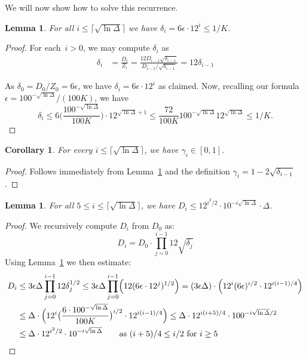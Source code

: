 \documentclass[11pt]{amsart}
\newtheorem{lemma}[theorem]{Lemma}
\newtheorem{corollary}[theorem]{Corollary}
\begin{document}
We will now show how to solve this recurrence.
\begin{lemma}
\label{r-prop3}
For all $i \leq \lceil \sqrt{\ln \Delta} \rceil$ we have $\delta_i = 6 \epsilon \cdot 12^i \leq 1/K$.
\end{lemma}
\begin{proof}
For each~$i > 0$, we may compute $\delta_i$ as
\begin{align*}
\delta_i &= \frac{D_i}{Z_i} = \frac{12 D_{i-1} \sqrt{\delta_{i-1}}}{D_{i-1}/\sqrt{\delta_{i-1}}} = 12 \delta_{i-1}
\end{align*}

As  $\delta_0 = D_0/Z_0 = 6 \epsilon$, we have $\delta_i = 6 \epsilon \cdot 12^i$ as claimed. Now, recalling our formula $\epsilon = 100^{-\sqrt{\ln \Delta}} / (100 K)$, we have 
$$
\delta_i \leq 6 \bigl( \frac{ 100^{-\sqrt{\ln \Delta}}}{100 K}  \bigr) \cdot  12^{\sqrt{\ln \Delta}+1} \leq \frac{ 72 }{100 K} 100^{-\sqrt{\ln \Delta}} 12^{\sqrt{\ln \Delta}} \leq 1/K.
$$
\end{proof}

\begin{corollary}
\label{gamma-cor}
For every $i \leq \lceil \sqrt{\ln \Delta} \rceil$, we have $\gamma_i \in [0,1]$.
\end{corollary}
\begin{proof}
Follows immediately from Lemma~\ref{r-prop3} and the definition $\gamma_i = 1 - 2 \sqrt{\delta_{i-1}}$.
\end{proof}

\begin{lemma}
\label{r-prop2}
For all $5 \leq i \leq \lceil \sqrt{\ln \Delta} \rceil$, we have $D_i \leq 12^{i^2/2} \cdot 10^{-i \sqrt{\ln \Delta}} \cdot \Delta$.
\end{lemma}
\begin{proof}
We recursively compute $D_i$ from $D_0$ as:
\begin{equation}
\label{d-rec-eqn}
D_i = D_0 \cdot \prod_{j=0}^{i-1} 12 \sqrt{\delta_j}
\end{equation}
Using Lemma~\ref{r-prop3} we then estimate:
\begin{align*}
D_i &\leq 3 \epsilon \Delta \prod_{j=0}^{i-1}  12 \delta_j^{1/2} \leq 3 \epsilon \Delta \prod_{j=0}^{i-1} \Bigl( 12 (6 \epsilon \cdot 12^j)^{1/2} \Bigr) = (3\epsilon\Delta)\cdot \Bigl( 12^{i} (6\epsilon)^{i/2} \cdot 12^{i(i-1)/4} \Bigr) \\
&\leq \Delta \cdot \Bigl (12^{i} \bigl( \frac{6 \cdot 100^{- \sqrt{\ln \Delta}}}{100 K} \bigr)^{i/2} \cdot 12^{i(i-1)/4} \Bigr) \leq \Delta \cdot 12^{i(i+5)/4} \cdot 100^{-i \sqrt{\ln\Delta} /2} \\
&\leq \Delta \cdot 12^{i^2/2} \cdot 10^{-i \sqrt{\ln\Delta}}  \qquad \text{as $(i+5)/4 \leq i/2$ for $i\geq 5$}
\end{align*}
\end{proof}
\end{document}
